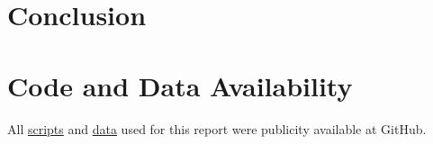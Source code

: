 \documentclass[a4paper, 11pt]{article}
\begin{document}
	\section*{Conclusion}
	
	\section*{Code and Data Availability}
	All \href{https://github.com/ph-u/CMEECourseWork_pmH/tree/master/MiniProject/code}{scripts} and \href{https://github.com/ph-u/CMEECourseWork_pmH/tree/master/MiniProject/data}{data} used for this report were publicity available at GitHub.
	\nocite{*}\printbibliography
\end{document}
